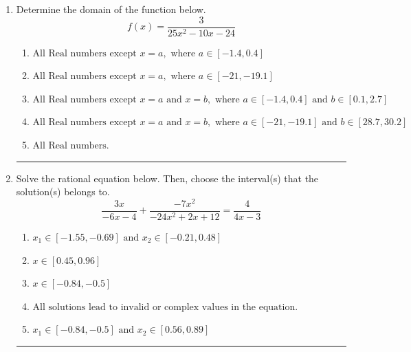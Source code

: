 \documentclass[14pt]{extbook}
\newcommand{\litem}[1]{\item#1\hspace*{-1cm}\rule{\textwidth}{0.4pt}}
\begin{document}
\begin{enumerate}
{\begin{enumerate}[label=\Alph*.]
\end{enumerate} }
\litem{
Determine the domain of the function below.\[ f(x) = \frac{3}{25x^{2} -10 x -24} \]\begin{enumerate}[label=\Alph*.]
\item \( \text{All Real numbers except } x = a, \text{ where } a \in [-1.4, 0.4] \)
\item \( \text{All Real numbers except } x = a, \text{ where } a \in [-21, -19.1] \)
\item \( \text{All Real numbers except } x = a \text{ and } x = b, \text{ where } a \in [-1.4, 0.4] \text{ and } b \in [0.1, 2.7] \)
\item \( \text{All Real numbers except } x = a \text{ and } x = b, \text{ where } a \in [-21, -19.1] \text{ and } b \in [28.7, 30.2] \)
\item \( \text{All Real numbers.} \)

\end{enumerate} }
\litem{
Solve the rational equation below. Then, choose the interval(s) that the solution(s) belongs to.\[ \frac{3x}{-6x -4} + \frac{-7x^{2}}{-24x^{2} +2 x + 12} = \frac{4}{4x -3} \]\begin{enumerate}[label=\Alph*.]
\item \( x_1 \in [-1.55, -0.69] \text{ and } x_2 \in [-0.21,0.48] \)
\item \( x \in [0.45,0.96] \)
\item \( x \in [-0.84,-0.5] \)
\item \( \text{All solutions lead to invalid or complex values in the equation.} \)
\item \( x_1 \in [-0.84, -0.5] \text{ and } x_2 \in [0.56,0.89] \)


\end{enumerate}}
\end{enumerate}
\end{document}
